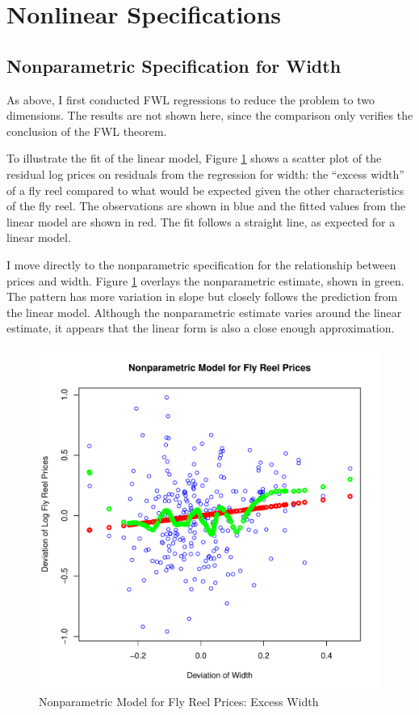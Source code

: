 \documentclass[11pt]{paper}
\begin{document}
\clearpage
\section{Nonlinear Specifications}


\subsection{Nonparametric Specification for Width}

As above, I first conducted FWL regressions 
to reduce the problem to two dimensions. 
The results are not shown here, 
since the comparison only verifies 
the conclusion of the FWL theorem. 

To illustrate the fit of the linear model, 
Figure \ref{fig:dev_np_vs_width_dev} 
shows a scatter plot 
of the residual log prices on 
residuals from the regression for 
width:
the ``excess width'' of a fly reel 
compared to what would be 
expected given the other characteristics of the fly reel. 
The observations are shown in blue
and the fitted values from the linear model are shown in red.
The fit follows a straight line, as expected for a linear model. 

% 
I move directly to the nonparametric specification for 
the relationship between prices and 
width.
Figure \ref{fig:dev_np_vs_width_dev} 
overlays the nonparametric estimate, shown in green. 
The pattern has more variation in slope but 
closely follows the prediction from the linear model. 
Although the nonparametric estimate varies around the linear estimate,
it appears that the linear form
is also a close enough approximation.


\begin{figure}[h!]
  \centering
  \includegraphics[scale = 0.5, keepaspectratio=true]{../Figures/dev_np_vs_width_dev}
  \caption{Nonparametric Model for Fly Reel Prices: Excess Width} \label{fig:dev_np_vs_width_dev}
\end{figure}
\end{document}
